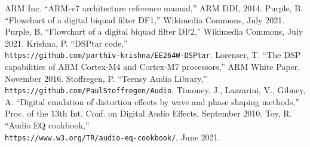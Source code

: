 \documentclass[conference]{IEEEtran}
\begin{document}
\begin{thebibliography}{00}
 ARM Inc. ``ARM-v7 architecture reference manual,'' ARM DDI, 2014.
 Purple, B. ``Flowchart of a digital biquad filter DF1,'' Wikimedia Commons, July 2021.
 Purple, B. ``Flowchart of a digital biquad filter DF2,'' Wikimedia Commons, July 2021.
 Krishna, P. ``DSPtar code,'' \\ \texttt{https://github.com/parthiv-krishna/EE264W-DSPtar}.
 Lorenser, T. ``The DSP capabilities of ARM Cortex-M4 and Cortex-M7 processors,'' ARM White Paper, November 2016.
 Stoffregen, P. ``Teensy Audio Library,'' \\ \texttt{https://github.com/PaulStoffregen/Audio}.
 Timoney, J., Lazzarini, V., Gibney, A. ``Digital emulation of distortion effects by wave and phase shaping methods,'' Proc. of the 13th Int. Conf. on Digital Audio Effects, September 2010.
 Toy, R. ``Audio EQ cookbook,'' \\ \texttt{https://www.w3.org/TR/audio-eq-cookbook/}, June 2021.

\end{thebibliography}
\end{document}
